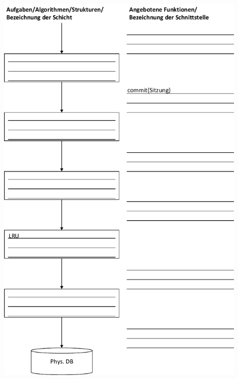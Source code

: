 \begin{normalText}
\begin{center}
	\includegraphics[width=0.9\textwidth]{Pictures/UeIDB11_Optimierung_Schichtenmodell.pdf}
\fi
\end{center}
\end{normalText}

